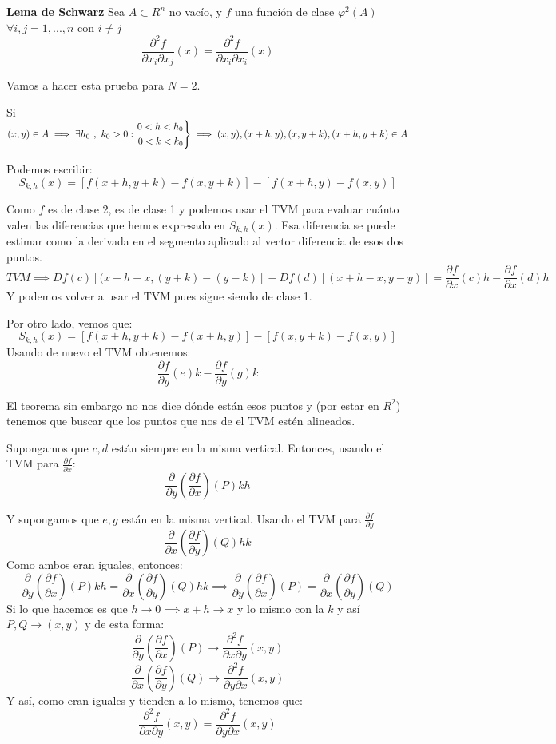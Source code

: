 \documentclass[11pt, a4paper, titlepage]{article}
\makeatletter
\renewenvironment{proof}[1][\proofname] {\vspace{-15pt}\par\pushQED{\qed}\normalfont\topsep6\p@\@plus6\p@\relax\trivlist\item[\hskip\labelsep\it#1\@addpunct{.}]\ignorespaces}{\popQED\endtrivlist\@endpefalse}
\theoremstyle{theorem-style}
\theoremstyle{definition-style}
\theoremstyle{remark-style}
\theoremstyle{example-style}
\newenvironment{rcases}
  {\left.\begin{aligned}}
  {\end{aligned}\right\rbrace}
\makeatother
\begin{document}
\textbf{Lema de Schwarz}
Sea $A\subset R^n$ no vacío, y $f$ una función de clase $\varphi^2(A)$
$\forall i,j = 1,...,n$ con $i\ne j$
\[
\frac{\partial^2f}{\partial x_i \partial x_j}(x) = \frac{\partial^2 f}{\partial x_i \partial x_i}(x)
\]
\begin{proof}

Vamos a hacer esta prueba para $N=2$.

Si $(x,y) \in A \implies \exists h_0 \ , \ k_0 > 0 : \begin{rcases}
	0 < h < h_0 \\
	0 < k < k_0
\end{rcases} \implies (x,y),(x+h,y),(x,y+k),(x+h,y+k) \in A$

Podemos escribir:
\[
S_{k,h}(x) =[f(x+h,y+k) - f(x,y+k)] - [f(x+h,y) -f(x,y)]
\]
	
Como $f$ es de clase 2, es de clase 1 y podemos usar el TVM para evaluar cuánto valen las diferencias que hemos expresado en $S_{k,h}(x)$. Esa diferencia se puede estimar como la derivada en el segmento aplicado al vector diferencia de esos dos puntos.
\[
TVM \implies Df(c)[(x+h-x,(y+k)-(y-k)] -Df(d)[(x+h-x,y-y)]= \frac{\partial f}{\partial x}(c)h - \frac{\partial f}{\partial x}(d)h
\]
Y podemos volver a usar el TVM pues sigue siendo de clase 1.

Por otro lado, vemos que:
\[
S_{k,h}(x)= [f(x+h,y+k)-f(x+h,y)]-[f(x,y+k)-f(x,y)]
\]
Usando de nuevo el TVM obtenemos:
\[
\frac{\partial f}{\partial y}(e)k - \frac{\partial f}{\partial y}(g)k
\]

El teorema sin embargo no nos dice dónde están esos puntos y (por estar en $R^2$) tenemos que buscar que los puntos que nos de el TVM estén alineados.

Supongamos que $c , d$ están siempre en la misma vertical. Entonces, usando el TVM para $\frac{\partial f}{\partial x}$:
\[
\frac{\partial}{\partial y}(\frac{\partial f}{\partial x})(P)kh
\]

Y supongamos que $e,g$ están en la misma vertical. Usando el TVM para $\frac{\partial f}{\partial y}$
\[
\frac{\partial }{\partial x}(\frac{\partial f}{\partial y})(Q)hk
\]
Como ambos eran iguales, entonces:
\[
\frac{\partial}{\partial y}(\frac{\partial f}{\partial x})(P)kh = \frac{\partial }{\partial x}(\frac{\partial f}{\partial y})(Q)hk \implies \frac{\partial}{\partial y}(\frac{\partial f}{\partial x})(P)=\frac{\partial }{\partial x}(\frac{\partial f}{\partial y})(Q)
\]
Si lo que hacemos es que $h \to 0 \implies x+h\to x$ y lo mismo con la $k$ y así $P,Q\to (x,y)$ y de esta forma:
\[
\frac{\partial}{\partial y}(\frac{\partial f}{\partial x})(P) \to \frac{\partial^2 f}{\partial x \partial y}(x,y)
\]
\[
\frac{\partial}{\partial x}(\frac{\partial f}{\partial y})(Q) \to \frac{\partial^2 f}{\partial y \partial x}(x,y)
\]
Y así, como eran iguales y tienden a lo mismo, tenemos que:
\[
\frac{\partial^2 f}{\partial x \partial y}(x,y) =  \frac{\partial^2 f}{\partial y \partial x}(x,y)
\]


\end{proof}
\end{document}
